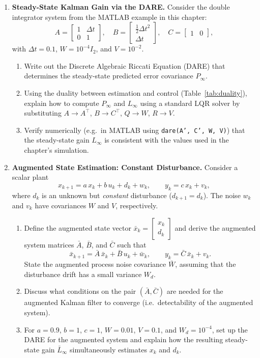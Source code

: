 \begin{enumerate}
\item \textbf{Steady-State Kalman Gain via the DARE.}
Consider the double integrator system from the MATLAB example in this chapter:
\[
A = \begin{bmatrix} 1 & \Delta t \\ 0 & 1 \end{bmatrix}, \quad
B = \begin{bmatrix} \tfrac{1}{2}\Delta t^2 \\ \Delta t \end{bmatrix}, \quad
C = \begin{bmatrix} 1 & 0 \end{bmatrix},
\]
with $\Delta t = 0.1$, $W = 10^{-4} I_2$, and $V = 10^{-2}$.

\begin{enumerate}
	\item Write out the Discrete Algebraic Riccati Equation (DARE) that determines the steady-state predicted error covariance $P_\infty$.
	\item Using the duality between estimation and control (Table~\ref{tab:duality}), explain how to compute $P_\infty$ and $L_\infty$ using a standard LQR solver by substituting $A \to A^\top$, $B \to C^\top$, $Q \to W$, $R \to V$.
	\item Verify numerically (e.g.\ in MATLAB using \texttt{dare(A', C', W, V)}) that the steady-state gain $L_\infty$ is consistent with the values used in the chapter's simulation.
\end{enumerate}

\item \textbf{Augmented State Estimation: Constant Disturbance.}
Consider a scalar plant
\[
	x_{k+1} = a\, x_k + b\, u_k + d_k + w_k, \qquad y_k = c\, x_k + v_k,
\]
where $d_k$ is an unknown but \emph{constant} disturbance ($d_{k+1} = d_k$). The noise $w_k$ and $v_k$ have covariances $W$ and $V$, respectively.

\begin{enumerate}
	\item Define the augmented state vector $\bar{x}_k = \begin{bmatrix} x_k \\ d_k \end{bmatrix}$ and derive the augmented system matrices $\bar{A}$, $\bar{B}$, and $\bar{C}$ such that
	\[
		\bar{x}_{k+1} = \bar{A}\,\bar{x}_k + \bar{B}\,u_k + \bar{w}_k, \qquad y_k = \bar{C}\,\bar{x}_k + v_k.
	\]
	State the augmented process noise covariance $\bar{W}$, assuming that the disturbance drift has a small variance $W_d$.
	\item Discuss what conditions on the pair $(\bar{A}, \bar{C})$ are needed for the augmented Kalman filter to converge (i.e.\ detectability of the augmented system).
	\item For $a = 0.9$, $b = 1$, $c = 1$, $W = 0.01$, $V = 0.1$, and $W_d = 10^{-4}$, set up the DARE for the augmented system and explain how the resulting steady-state gain $\bar{L}_\infty$ simultaneously estimates $x_k$ and $d_k$.
\end{enumerate}


\end{enumerate}
